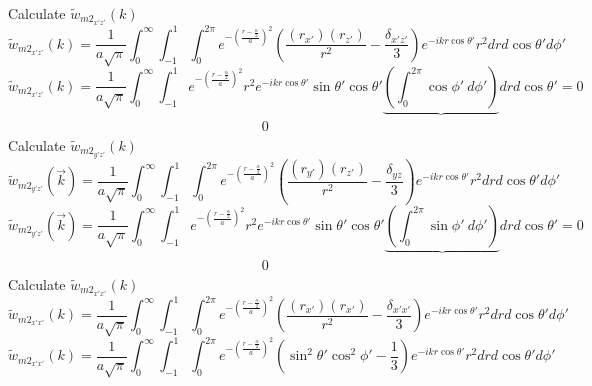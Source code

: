 \documentclass[double,12pt]{beavtex}
\begin{document}
Calculate $\widetilde{w}_{{m2}_{x'z'}}(k)$ 
\begin{equation}{\widetilde{w}_{{m2}_{x'z'}}(k)=\frac{1}{a\sqrt{\pi}}\int_{0}^{\infty}\int_{-1}^{1}\int_{0}^{2\pi}e^{-\left(\frac{r-\frac{\alpha}{2}}{a}\right)^2}\left(\frac{(r_{x'})(r_{z'})}{r^2}-\frac{\delta_{x'z'}}{3}\right)e^{-ikr\cos\theta'}r^2d{r}d{\cos\theta'}d{\phi'}}\end{equation}
\begin{equation}{\widetilde{w}_{{m2}_{x'z'}}(k)=\frac{1}{a\sqrt{\pi}}\int_{0}^{\infty}\int_{-1}^{1}e^{-\left(\frac{r-\frac{\alpha}{2}}{a}\right)^2}r^2e^{-ikr\cos\theta'}\sin\theta'\cos\theta'\underbrace{\left(\int_{0}^{2\pi}\cos\phi'~d{\phi'}\right)}d{r}d{\cos\theta'}=0}\end{equation}
$~~~~~~~~~~~~~~~~~~~~~~~~~~~~~~~~~~~~~~~~~~~~~~~~~~~~~~~~~~~~~~~~~~~~~~~~~~~~~~~~~~0$
\[{}\]
Calculate $\widetilde{w}_{{m2}_{y'z'}}(k)$ 
\begin{equation}{\widetilde{w}_{{m2}_{y'z'}}(\vec{k})=\frac{1}{a\sqrt{\pi}}\int_{0}^{\infty}\int_{-1}^{1}\int_{0}^{2\pi}e^{-\left(\frac{r-\frac{\alpha}{2}}{a}\right)^2}\left(\frac{(r_{y'})(r_{z'})}{r^2}-\frac{\delta_{yz}}{3}\right)e^{-ikr\cos\theta'}r^2d{r}d{\cos\theta'}d{\phi'}}\end{equation}
\begin{equation}{\widetilde{w}_{{m2}_{y'z'}}(\vec{k})=\frac{1}{a\sqrt{\pi}}\int_{0}^{\infty}\int_{-1}^{1}e^{-\left(\frac{r-\frac{\alpha}{2}}{a}\right)^2}r^2e^{-ikr\cos\theta'}\sin\theta'\cos\theta'\underbrace{\left(\int_{0}^{2\pi}\sin\phi'~d{\phi'}\right)}d{r}d{\cos\theta'}=0}\end{equation}
$~~~~~~~~~~~~~~~~~~~~~~~~~~~~~~~~~~~~~~~~~~~~~~~~~~~~~~~~~~~~~~~~~~~~~~~~~~~~~~~~~~0$
\[{}\]
Calculate $\widetilde{w}_{{m2}_{x'x'}}(k)$ 
\begin{equation}{\widetilde{w}_{{m2}_{x'x'}}(k)=\frac{1}{a\sqrt{\pi}}\int_{0}^{\infty}\int_{-1}^{1}\int_{0}^{2\pi}e^{-\left(\frac{r-\frac{\alpha}{2}}{a}\right)^2}\left(\frac{(r_{x'})(r_{x'})}{r^2}-\frac{\delta_{x'x'}}{3}\right)e^{-ikr\cos\theta'}r^2d{r}d{\cos\theta'}d{\phi'}}\end{equation}
\begin{equation}{\widetilde{w}_{{m2}_{x'x'}}(k)=\frac{1}{a\sqrt{\pi}}\int_{0}^{\infty}\int_{-1}^{1}\int_{0}^{2\pi}e^{-\left(\frac{r-\frac{\alpha}{2}}{a}\right)^2}\left(\sin^2\theta'\cos^2\phi'-\frac{1}{3}\right)e^{-ikr\cos\theta'}r^2d{r}d{\cos\theta'}d{\phi'}}\end{equation}
\[{}\]
\end{document}
